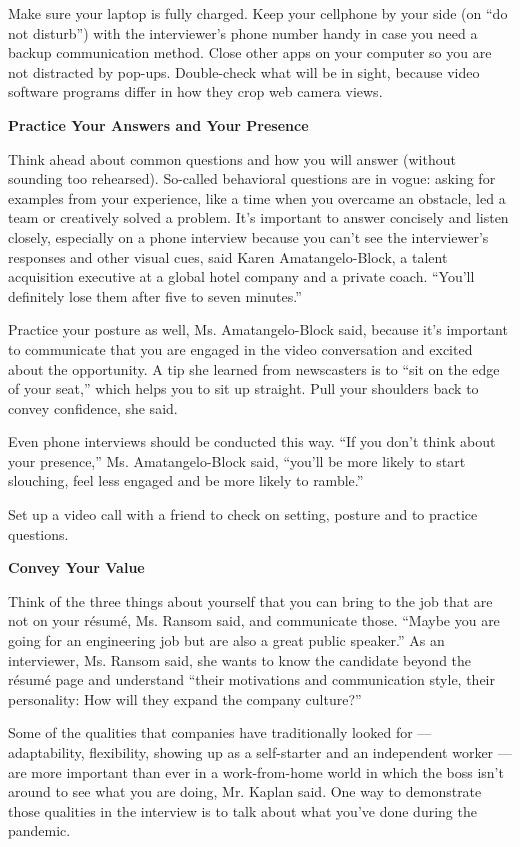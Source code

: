 Make sure your laptop is fully charged. Keep your cellphone by your side
(on ``do not disturb'') with the interviewer's phone number handy in
case you need a backup communication method. Close other apps on your
computer so you are not distracted by pop-ups. Double-check what will be
in sight, because video software programs differ in how they crop web
camera views.

\textbf{Practice Your Answers and Your Presence}

Think ahead about common questions and how you will answer (without
sounding too rehearsed). So-called behavioral questions are in vogue:
asking for examples from your experience, like a time when you overcame
an obstacle, led a team or creatively solved a problem. It's important
to answer concisely and listen closely, especially on a phone interview
because you can't see the interviewer's responses and other visual cues,
said Karen Amatangelo-Block, a talent acquisition executive at a global
hotel company and a private coach. ``You'll definitely lose them after
five to seven minutes.''

Practice your posture as well, Ms. Amatangelo-Block said, because it's
important to communicate that you are engaged in the video conversation
and excited about the opportunity. A tip she learned from newscasters is
to ``sit on the edge of your seat,'' which helps you to sit up straight.
Pull your shoulders back to convey confidence, she said.

Even phone interviews should be conducted this way. ``If you don't think
about your presence,'' Ms. Amatangelo-Block said, ``you'll be more
likely to start slouching, feel less engaged and be more likely to
ramble.''

Set up a video call with a friend to check on setting, posture and to
practice questions.

\textbf{Convey Your Value}

Think of the three things about yourself that you can bring to the job
that are not on your résumé, Ms. Ransom said, and communicate those.
``Maybe you are going for an engineering job but are also a great public
speaker.'' As an interviewer, Ms. Ransom said, she wants to know the
candidate beyond the résumé page and understand ``their motivations and
communication style, their personality: How will they expand the company
culture?''

Some of the qualities that companies have traditionally looked for ---
adaptability, flexibility, showing up as a self-starter and an
independent worker --- are more important than ever in a work-from-home
world in which the boss isn't around to see what you are doing, Mr.
Kaplan said. One way to demonstrate those qualities in the interview is
to talk about what you've done during the pandemic.

